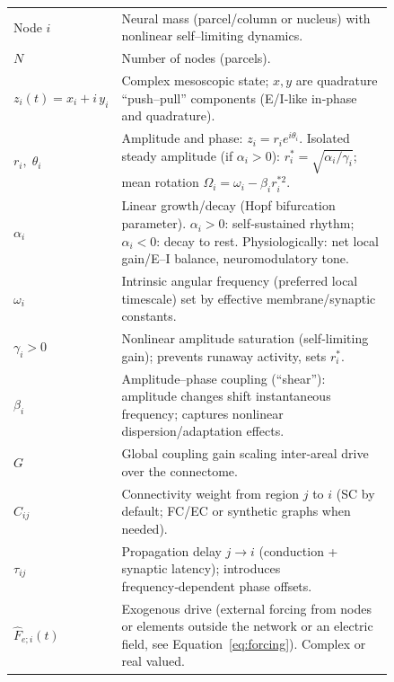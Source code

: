 \documentclass[11pt]{article}
\numberwithin{equation}{section}
\begin{document}
\begin{tcolorbox}[
  colback=gray!5,
  colframe=slate,
  colbacktitle=softblue!25,
  coltitle=softblue!60!black,
  fonttitle=\bfseries\small,
  title={\small \textit{Stuart-Landau Network (Eq.~\ref{eq:sl_connectome})}\\ Whole-brain Simulations Parameters \& Physiological Meaning },
  boxrule=0.4pt, enhanced, sharp corners,
  left=4pt,right=4pt,top=3pt,bottom=3pt,
  boxsep=2pt, before skip=6pt, after skip=6pt
]
\scriptsize
\begin{tabular}{@{}l p{0.84\linewidth}@{}}
Node $i$ & Neural mass (parcel/column or nucleus) with nonlinear self–limiting dynamics.\\
\textbf{$N$} & Number of nodes (parcels).\\
\textbf{$z_i(t)=x_i+i\,y_i$} & Complex mesoscopic state; $x,y$ are quadrature “push–pull” components (E/I‑like in‑phase and quadrature).\\
\textbf{$r_i,\;\theta_i$} & Amplitude and phase: $z_i=r_i e^{i\theta_i}$. Isolated steady amplitude (if $\alpha_i>0$): $r_i^{*}=\sqrt{\alpha_i/\gamma_i}$; mean rotation $\Omega_i=\omega_i-\beta_i r_i^{*2}$.\\
\textbf{$\alpha_i$} & Linear growth/decay (Hopf bifurcation parameter). $\alpha_i>0$: self‑sustained rhythm; $\alpha_i<0$: decay to rest. Physiologically: net local gain/E–I balance, neuromodulatory tone.\\
\textbf{$\omega_i$} & Intrinsic angular frequency (preferred local timescale) set by effective membrane/synaptic constants.\\
\textbf{$\gamma_i>0$} & Nonlinear amplitude saturation (self‑limiting gain); prevents runaway activity, sets $r_i^{*}$.\\
\textbf{$\beta_i$} & Amplitude–phase coupling (“shear”): amplitude changes shift instantaneous frequency; captures nonlinear dispersion/adaptation effects.\\
\textbf{$G$} & Global coupling gain scaling inter‑areal drive over the connectome.\\
\textbf{$C_{ij}$} & Connectivity weight from region $j$ to $i$ (SC by default; FC/EC or synthetic graphs when needed).\\
\textbf{$\tau_{ij}$} & Propagation delay $j{\to}i$ (conduction + synaptic latency); introduces frequency‑dependent phase offsets.\\
\textbf{$\hat F_{e;i}(t)$}& Exogenous drive  (external forcing from nodes or elements outside the network or an electric field, see Equation~\ref{eq:forcing}). Complex or real valued.\\


\end{tabular}
\end{tcolorbox}
\end{document}
